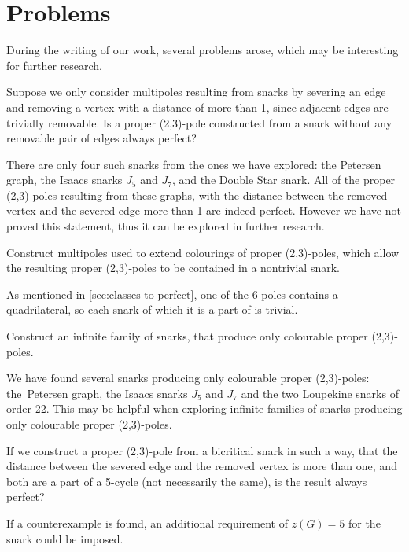 \section{Problems}\label{sec:problems}

During the writing of our work, several problems arose, which may be interesting for further research.

\begin{problem}
	Suppose we only consider multipoles resulting from snarks by severing an edge and removing a vertex with a distance of more than 1, since adjacent edges are trivially removable. Is a proper (2,3)-pole constructed from a snark without any removable pair of edges always perfect?
\end{problem}

There are only four such snarks from the ones we have explored: the Petersen graph, the Isaacs snarks $J_5$ and $J_7$, and the Double Star snark. All of the proper (2,3)-poles resulting from these graphs, with the distance between the removed vertex and the severed edge more than 1 are indeed perfect. However we have not proved this statement, thus it can be explored in further research.

\begin{problem}
	Construct multipoles used to extend colourings of proper (2,3)-poles, which allow the resulting proper (2,3)-poles to be contained in a nontrivial snark.
\end{problem}

As mentioned in \cref{sec:classes-to-perfect}, one of the 6-poles contains a quadrilateral, so each snark of which it is a part of is trivial.

\begin{problem}
	Construct an infinite family of snarks, that produce only colourable proper (2,3)-poles.
\end{problem}

We have found several snarks producing only colourable proper (2,3)-poles: the~Petersen graph, the Isaacs snarks $J_5$ and $J_7$ and the two Loupekine snarks of order 22. This may be helpful when exploring infinite families of snarks producing only colourable proper (2,3)-poles.

\begin{problem}
	If we construct a proper (2,3)-pole from a bicritical snark in such a way, that the distance between the severed edge and the removed vertex is more than one, and both are a part of a 5-cycle (not necessarily the same), is the result always perfect?
\end{problem}

If a counterexample is found, an additional requirement of $z(G)=5$ for the snark could be imposed.